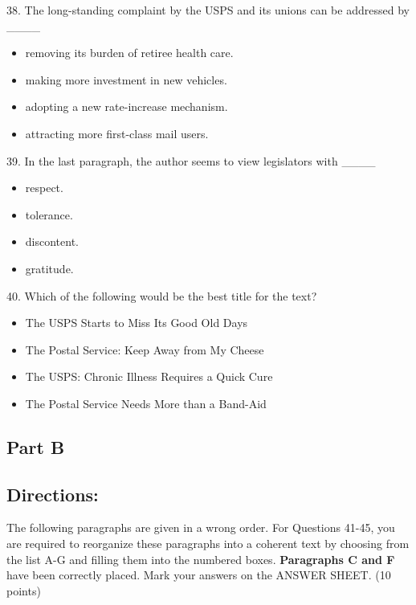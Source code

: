 \documentclass[UTF8,11pt]{ctexart}
\begin{document}
38. The long-standing complaint by the USPS and its unions can be addressed by \_\_\_\_


\begin{itemize}[leftmargin=2em,itemsep=.2em,topsep=.4em]\item[A.] removing its burden of retiree health care.
\item[B.] making more investment in new vehicles.
\item[C.] adopting a new rate-increase mechanism.
\item[D.] attracting more first-class mail users.
\end{itemize}

39. In the last paragraph, the author seems to view legislators with \_\_\_\_


\begin{itemize}[leftmargin=2em,itemsep=.2em,topsep=.4em]\item[A.] respect.
\item[B.] tolerance.
\item[C.] discontent.
\item[D.] gratitude.
\end{itemize}

40. Which of the following would be the best title for the text?


\begin{itemize}[leftmargin=2em,itemsep=.2em,topsep=.4em]\item[A.] The USPS Starts to Miss Its Good Old Days
\item[B.] The Postal Service: Keep Away from My Cheese
\item[C.] The USPS: Chronic Illness Requires a Quick Cure
\item[D.] The Postal Service Needs More than a Band-Aid
\end{itemize}

\subsection*{\textbf{Part B}}


\subsection*{\textbf{Directions:}}


The following paragraphs are given in a wrong order. For Questions 41-45, you are required to reorganize these paragraphs into a coherent text by choosing from the list A-G and filling them into the numbered boxes. \textbf{Paragraphs C and F} have been correctly placed. Mark your answers on the ANSWER SHEET. (10 points)
\end{document}
